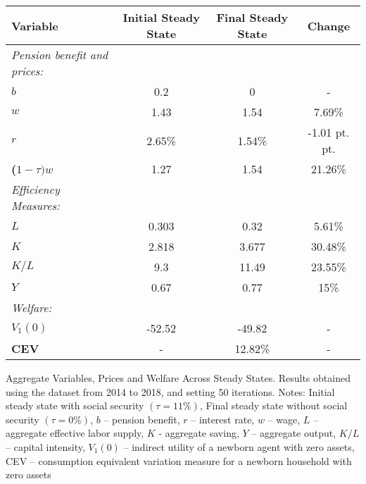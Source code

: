 \begin{center}
    \begin{tabular}{lccc}
      \textbf{Variable}  & \textbf{Initial Steady State} & \textbf{Final Steady State} & \textbf{Change} \\
    \midrule
    \textit{Pension benefit and prices:}                          &         &           &        \\
    \textbf{$b$}                          &   0.2      &    0       &    -    \\
    \textbf{$w$}                          &    1.43     &     1.54      &   7.69\%     \\
    \textbf{$r$}                          &    2.65\%     &    1.54\%       &    -1.01 pt. pt.    \\
    \textbf{($1-\tau)w$}                          &   1.27      &   1.54        &  21.26\%      \\
    \midrule
    \textit{Efficiency Measures:}                          &         &           &        \\
    \textbf{$L$}                          &   0.303      &     0.32      &   5.61\%     \\
    \textbf{$K$}                          &   2.818      &      3.677     &   30.48\%     \\
    \textbf{$K/L$}                          &     9.3    &     11.49      &   23.55\%     \\
    \textbf{$Y$}                          &    0.67     &     0.77      &   15\%     \\
    \midrule
    \textit{Welfare:}                          &         &           &        \\
    \textbf{$V_{1}(0)$}                          &    -52.52     &     -49.82      &  -      \\
    \textbf{CEV}                          &  -       &     12.82\%      &   -     \\
    
    \bottomrule
    \end{tabular}
    \caption{Aggregate Variables, Prices and Welfare Across
    Steady States. Results obtained using the dataset from 2014 to 2018, and setting 50 iterations.
    Notes: Initial steady state with social security $(\tau = 11\%)$, Final steady state without
    social security $(\tau = 0\%)$, $b$ – pension benefit, $r$ – interest rate, $w$ – wage, $L$ – aggregate effective labor supply, $K$ - aggregate saving, $Y$ – aggregate output,
    $ K/L$ – capital intensity, $V_{1}(0)$ – indirect utility of a newborn
    agent with zero assets, CEV – consumption equivalent variation measure for a newborn
    household with zero assets}
    \end{center}